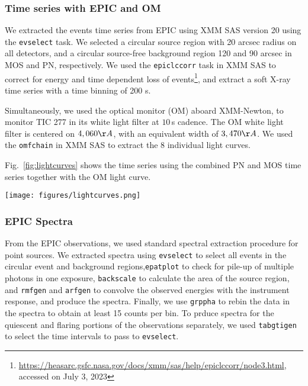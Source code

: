 \documentclass[twocolumn]{aastex631}
\begin{document}
\subsubsection{Time series with EPIC and OM}

 We extracted the events time series from EPIC using XMM SAS version 20 using the \texttt{evselect} task. We selected a circular source region with 20 arcsec radius on all detectors, and a circular source-free background region 120 and 90 arcsec in MOS and PN, respectively. We used the \texttt{epiclccorr} task in XMM SAS to correct for energy and time dependent loss of events\footnote{\url{https://heasarc.gsfc.nasa.gov/docs/xmm/sas/help/epiclccorr/node3.html}, accessed on July 3, 2023}, and extract a soft X-ray time series with a time binning of 200 s.

Simultaneously, we used the optical monitor (OM) aboard XMM-Newton, to monitor TIC 277 in its white light filter at $10$\,s cadence. The OM white light filter is centered on $4,060\AA$, with an equivalent width of $3,470\AA$. We used the \texttt{omfchain} in XMM SAS to extract the 8 individual light curves.

Fig.~\ref{fig:lightcurves} shows the time series using the combined PN and MOS time series together with the OM light curve.

\begin{figure*}[ht!]
    \begin{centering}
        \texttt{[image: figures/lightcurves.png]}
        \caption{
         Top panel: Optical Monitoring (OM) light curve. Bottom panel: X-ray (PN, MOS1 and MOS2 combined) light curve. The grey shaded portion defines the flare-only subset of the observations (see Section~\ref{sec:methods:epic} and Table~\ref{tab:specfit}).
        }
        \label{fig:lightcurves}
    \end{centering}
\end{figure*}


\subsubsection{EPIC Spectra}
From the EPIC observations, we used standard spectral extraction procedure for point sources. We extracted spectra using \texttt{evselect} to select all events in the circular event and background regions,\texttt{epatplot} to check for pile-up of multiple photons in one exposure, \texttt{backscale} to calculate the area of the source region, and \texttt{rmfgen} and \texttt{arfgen} to convolve the observed energies with the instrument response, and produce the spectra. Finally, we use \texttt{grppha} to rebin the data in the spectra to obtain at least 15 counts per bin. To prduce spectra for the quiescent and flaring portions of the observations separately, we used \texttt{tabgtigen} to select the time intervals to pass to \texttt{evselect}.
\end{document}
